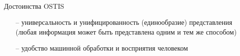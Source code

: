 \begin{frame}{\\Достоинства OSTIS}
	\begin{itemize}
		\item[--] универсальность и унифицированность (единообразие) представления (любая информация может быть представлена одним и тем же способом)
		\item[--] удобство машинной обработки и восприятия человеком
		
	\end{itemize}
\end{frame}


\begin{frame}{\\}
	
\end{frame}